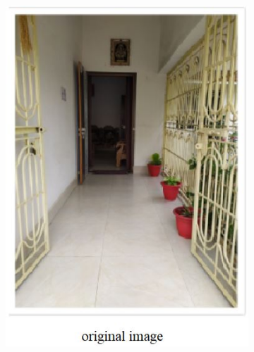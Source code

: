 \documentclass[a4]{article}
\begin{document}
\begin{figure}[H]
\begin{subfigure}{.3\textwidth}
		\includegraphics[width=.9\linewidth]{q1_1}
	\end{subfigure}
	\caption{}
\end{figure}
\end{document}
